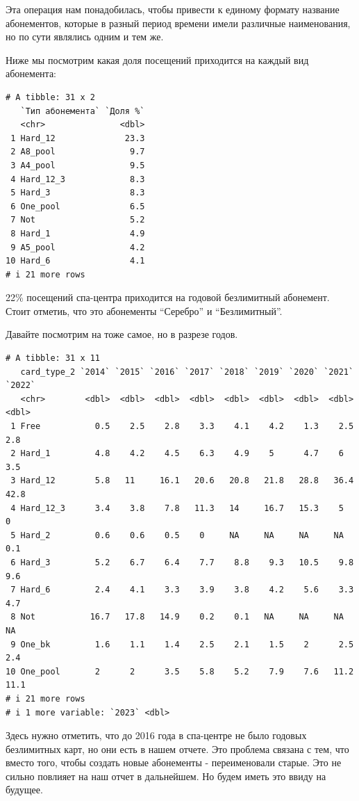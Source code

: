 \documentclass[
  letterpaper,
  DIV=11,
  numbers=noendperiod]{scrartcl}
\begin{document}
Эта операция нам понадобилась, чтобы привести к единому формату название
абонементов, которые в разный период времени имели различные
наименования, но по сути являлись одним и тем же.

Ниже мы посмотрим какая доля посещений приходится на каждый вид
абонемента:

\begin{verbatim}
# A tibble: 31 x 2
   `Тип абонемента` `Доля %`
   <chr>               <dbl>
 1 Hard_12              23.3
 2 А8_pool               9.7
 3 А4_pool               9.5
 4 Hard_12_3             8.3
 5 Hard_3                8.3
 6 One_pool              6.5
 7 Not                   5.2
 8 Hard_1                4.9
 9 А5_pool               4.2
10 Hard_6                4.1
# i 21 more rows
\end{verbatim}

22\% посещений спа-центра приходится на годовой безлимитный абонемент.
Стоит отметиь, что это абонементы ``Серебро'' и ``Безлимитный''.

Давайте посмотрим на тоже самое, но в разрезе годов.

\begin{verbatim}
# A tibble: 31 x 11
   сard_type_2 `2014` `2015` `2016` `2017` `2018` `2019` `2020` `2021` `2022`
   <chr>        <dbl>  <dbl>  <dbl>  <dbl>  <dbl>  <dbl>  <dbl>  <dbl>  <dbl>
 1 Free           0.5    2.5    2.8    3.3    4.1    4.2    1.3    2.5    2.8
 2 Hard_1         4.8    4.2    4.5    6.3    4.9    5      4.7    6      3.5
 3 Hard_12        5.8   11     16.1   20.6   20.8   21.8   28.8   36.4   42.8
 4 Hard_12_3      3.4    3.8    7.8   11.3   14     16.7   15.3    5      0  
 5 Hard_2         0.6    0.6    0.5    0     NA     NA     NA     NA      0.1
 6 Hard_3         5.2    6.7    6.4    7.7    8.8    9.3   10.5    9.8    9.6
 7 Hard_6         2.4    4.1    3.3    3.9    3.8    4.2    5.6    3.3    4.7
 8 Not           16.7   17.8   14.9    0.2    0.1   NA     NA     NA     NA  
 9 One_bk         1.6    1.1    1.4    2.5    2.1    1.5    2      2.5    2.4
10 One_pool       2      2      3.5    5.8    5.2    7.9    7.6   11.2   11.1
# i 21 more rows
# i 1 more variable: `2023` <dbl>
\end{verbatim}

Здесь нужно отметить, что до 2016 года в спа-центре не было годовых
безлимитных карт, но они есть в нашем отчете. Это проблема связана с
тем, что вместо того, чтобы создать новые абонементы - переименовали
старые. Это не сильно повлияет на наш отчет в дальнейшем. Но будем иметь
это ввиду на будущее.
\end{document}
